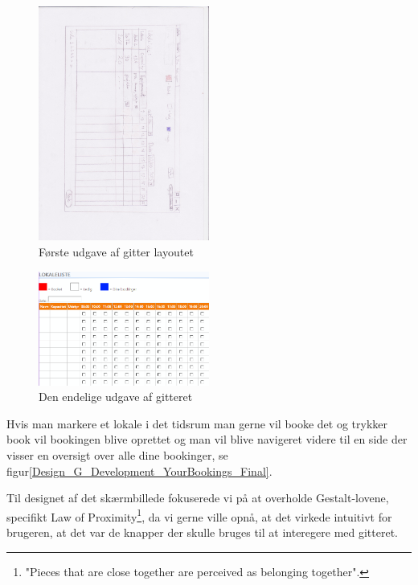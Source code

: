 \begin{figure}[h!]
  \centering
    \includegraphics[width=0.5\textwidth, angle=90]{Appendix/GUI-Prototype/PaperMockup/LokaleListe_001}
  \caption{Første udgave af gitter layoutet}
\label{Design_G_Development_FirstGrid}
\end{figure}

\begin{figure}[h!]
  \centering
    \includegraphics[width=0.5\textwidth]{Appendix/GUI-Prototype/DigitalMockup/GridEksempel}
  \caption{Den endelige udgave af gitteret}
\label{Design_G_Development_FinalGrid}
\end{figure}

Hvis man markere et lokale i det tidsrum man gerne vil booke det og trykker book vil bookingen blive oprettet og man vil blive navigeret videre til en side der visser en oversigt over alle dine bookinger, se figur\ref{Design_G_Development_YourBookings_Final}. 

Til designet af det skærmbillede fokuserede vi på at overholde Gestalt-lovene\cite[s. 68]{SL_UID}, specifikt Law of Proximity\footnote{"Pieces that are close together are perceived as belonging together".}, da vi gerne ville opnå, at det virkede intuitivt for brugeren, at det var de knapper der skulle bruges til at interegere med gitteret. 

